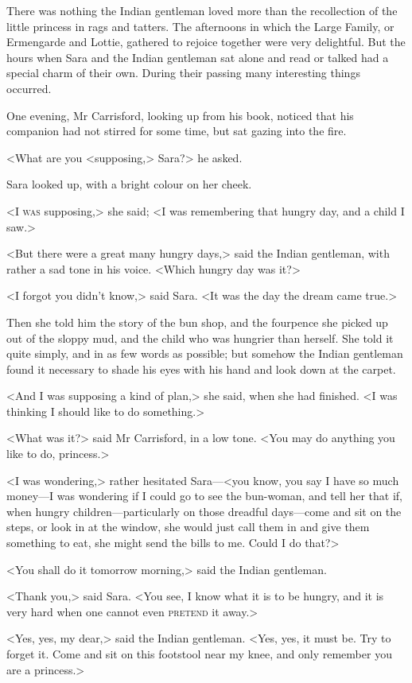 There was nothing the Indian gentleman loved more than the recollection of the little princess in rags and tatters. The afternoons in which the Large Family, or Ermengarde and Lottie, gathered to rejoice together were very delightful. But the hours when Sara and the Indian gentleman sat alone and read or talked had a special charm of their own. During their passing many interesting things occurred.

One evening, Mr Carrisford, looking up from his book, noticed that his companion had not stirred for some time, but sat gazing into the fire.

<What are you <supposing,> Sara?> he asked.

Sara looked up, with a bright colour on her cheek.

<I \textsc{was} supposing,> she said; <I was remembering that hungry day, and a child I saw.>

<But there were a great many hungry days,> said the Indian gentleman, with rather a sad tone in his voice. <Which hungry day was it?>

<I forgot you didn't know,> said Sara. <It was the day the dream came true.>

Then she told him the story of the bun shop, and the fourpence she picked up out of the sloppy mud, and the child who was hungrier than herself. She told it quite simply, and in as few words as possible; but somehow the Indian gentleman found it necessary to shade his eyes with his hand and look down at the carpet.

<And I was supposing a kind of plan,> she said, when she had finished. <I was thinking I should like to do something.>

<What was it?> said Mr Carrisford, in a low tone. <You may do anything you like to do, princess.>

<I was wondering,> rather hesitated Sara—<you know, you say I have so much money—I was wondering if I could go to see the bun-woman, and tell her that if, when hungry children—particularly on those dreadful days—come and sit on the steps, or look in at the window, she would just call them in and give them something to eat, she might send the bills to me. Could I do that?>

<You shall do it tomorrow morning,> said the Indian gentleman.

<Thank you,> said Sara. <You see, I know what it is to be hungry, and it is very hard when one cannot even \textsc{pretend} it away.>

<Yes, yes, my dear,> said the Indian gentleman. <Yes, yes, it must be. Try to forget it. Come and sit on this footstool near my knee, and only remember you are a princess.>


